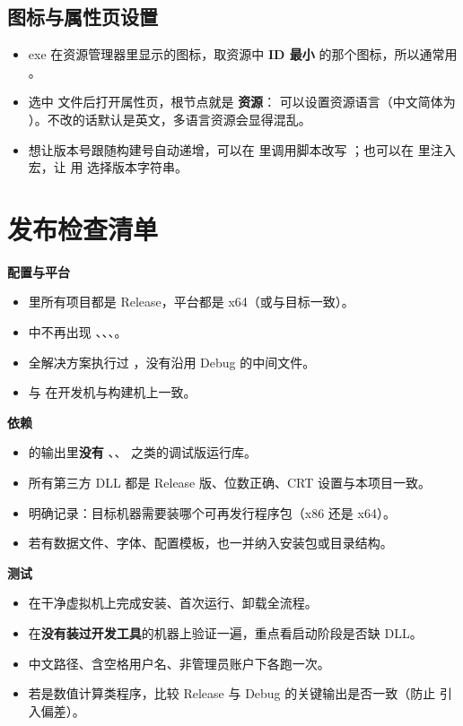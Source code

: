 \subsection{图标与属性页设置}
\begin{itemize}
  \item exe 在资源管理器里显示的图标，取资源中 \textbf{ID 最小} 的那个图标，所以通常用 。
  \item 选中  文件后打开属性页，根节点就是 \textbf{资源}： 可以设置资源语言（中文简体为 ）。不改的话默认是英文，多语言资源会显得混乱。
  \item 想让版本号跟随构建号自动递增，可以在  里调用脚本改写 ；也可以在  里注入宏，让  用  选择版本字符串。
\end{itemize}
\section{发布检查清单}
\textbf{配置与平台}
\begin{itemize}
  \item[$\square$]  里所有项目都是 Release，平台都是 x64（或与目标一致）。
  \item[$\square$]  中不再出现 、、、。
  \item[$\square$] 全解决方案执行过 ，没有沿用 Debug 的中间文件。
  \item[$\square$]  与  在开发机与构建机上一致。
\end{itemize}

\textbf{依赖}
\begin{itemize}
  \item[$\square$]  的输出里\textbf{没有} 、、 之类的调试版运行库。
  \item[$\square$] 所有第三方 DLL 都是 Release 版、位数正确、CRT 设置与本项目一致。
  \item[$\square$] 明确记录：目标机器需要装哪个可再发行程序包（x86 还是 x64）。
  \item[$\square$] 若有数据文件、字体、配置模板，也一并纳入安装包或目录结构。
\end{itemize}

\textbf{测试}
\begin{itemize}
  \item[$\square$] 在干净虚拟机上完成安装、首次运行、卸载全流程。
  \item[$\square$] 在\textbf{没有装过开发工具}的机器上验证一遍，重点看启动阶段是否缺 DLL。
  \item[$\square$] 中文路径、含空格用户名、非管理员账户下各跑一次。
  \item[$\square$] 若是数值计算类程序，比较 Release 与 Debug 的关键输出是否一致（防止  引入偏差）。
\end{itemize}

